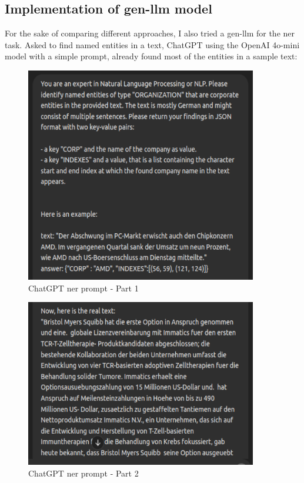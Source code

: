 \subsection{Implementation of \gls{gen-llm} model}
For the sake of comparing different approaches, I also tried a \gls{gen-llm} for the \gls{ner} task.
Asked to find named entities in a text, ChatGPT using the OpenAI 4o-mini model with a simple \gls{prompt}, already found most of the entities in a sample text:

\begin{figure}[H]   %
    \centering                                                                                                                     
    \includegraphics[width=0.9\textwidth]{Assets/chatgpt11}
    \caption{ChatGPT \gls{ner} \gls{prompt} - Part 1}
    \label{fig:chatgpt11}
\end{figure}
\begin{figure}[H]   %
    \centering
    \includegraphics[width=0.9\textwidth]{Assets/chatgpt12}
    \caption{ChatGPT \gls{ner} \gls{prompt} - Part 2}
    \label{fig:chatgpt12}
\end{figure}

